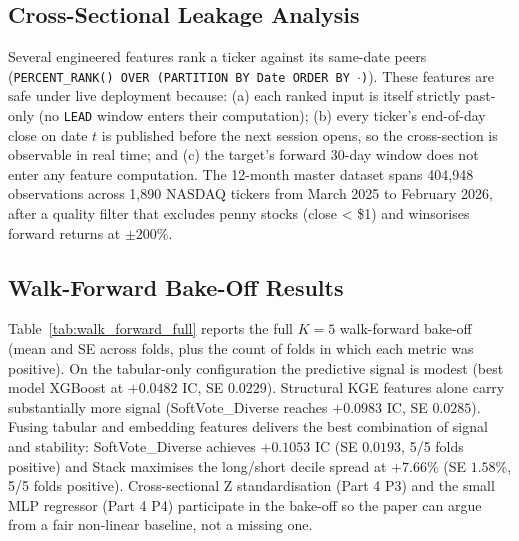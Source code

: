 \documentclass[10pt,journal,compsoc]{IEEEtran}
\begin{document}
\subsection{Cross-Sectional Leakage Analysis}
Several engineered features rank a ticker against its same-date peers (\texttt{PERCENT\_RANK() OVER (PARTITION BY Date ORDER BY $\cdot$)}). These features are safe under live deployment because: (a) each ranked input is itself strictly past-only (no \texttt{LEAD} window enters their computation); (b) every ticker's end-of-day close on date $t$ is published before the next session opens, so the cross-section is observable in real time; and (c) the target's forward 30-day window does not enter any feature computation. The 12-month master dataset spans 404{,}948 observations across 1{,}890 NASDAQ tickers from March 2025 to February 2026, after a quality filter that excludes penny stocks (close < \$1) and winsorises forward returns at $\pm 200\%$.

\subsection{Walk-Forward Bake-Off Results}
Table~\ref{tab:walk_forward_full} reports the full $K=5$ walk-forward bake-off (mean and SE across folds, plus the count of folds in which each metric was positive). On the tabular-only configuration the predictive signal is modest (best model XGBoost at $+0.0482$ IC, SE $0.0229$). Structural KGE features alone carry substantially more signal (SoftVote\_Diverse reaches $+0.0983$ IC, SE $0.0285$). Fusing tabular and embedding features delivers the best combination of signal and stability: SoftVote\_Diverse achieves $+0.1053$ IC (SE $0.0193$, 5/5 folds positive) and Stack maximises the long/short decile spread at $+7.66\%$ (SE $1.58\%$, 5/5 folds positive). Cross-sectional Z standardisation (Part 4 P3) and the small MLP regressor (Part 4 P4) participate in the bake-off so the paper can argue from a fair non-linear baseline, not a missing one.
\end{document}
